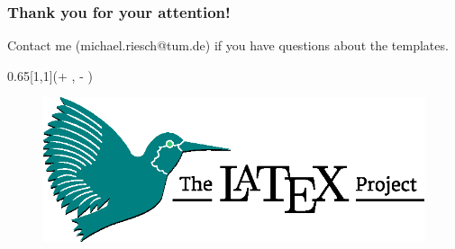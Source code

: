 \documentclass{tum-presentation}
\begin{document}
\begin{frame}
\frametitle{Thank you for your attention!}

Contact me (michael.riesch@tum.de) if you have questions about the templates.

  \begin{textblock*}{0.65\paperwidth}[1,1](\textwidth + \PraesentationSeitenrand, \textheight - \PraesentationSeitenrand)%
    \begin{figure}
      \includegraphics[width=0.6\paperwidth]{figures/latex-project-logo}
    \end{figure}
  \end{textblock*}


\end{frame}
\end{document}
